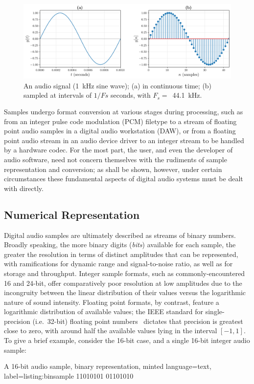 \begin{figure}[ht]
    \centering
    \includegraphics[width=\textwidth]{figures/digital-signal}
    \caption{
        An audio signal (\qty{1}{\kHz} sine wave);
        (a) in continuous time;
        (b) sampled at intervals of $1/Fs$ seconds, with
        $F_s =$~\qty{44.1}{\kHz}.
    }
    \label{fig:signal-samples}
\end{figure}

Samples undergo format conversion at various stages during processing, such as
from an integer pulse code modulation (PCM) filetype to a stream of floating
point audio samples in a digital audio workstation (DAW), or from a floating
point audio stream in an audio device driver to an integer stream to be handled
by a hardware codec.
For the most part, the user, and even the developer of audio software, need not
concern themselves with the rudiments of sample representation and conversion;
as shall be shown, however, under certain circumstances these fundamental
aspects of digital audio systems must be dealt with directly.

\subsection{Numerical Representation}\label{subsec:numerical-representation}

Digital audio samples are ultimately described as streams of binary numbers.
Broadly speaking, the more binary digits (\textit{bits}) available for each
sample, the greater the resolution in terms of distinct amplitudes that can be
represented, with ramifications for dynamic range and signal-to-noise ratio, as
well as for storage and throughput.
Integer sample formats, such as commonly-encountered 16 and 24-bit, offer
comparatively poor resolution at low amplitudes due to the incongruity between
the linear distribution of their values versus the logarithmic nature of sound
intensity.
Floating point formats, by contrast, feature a logarithmic distribution of
available values; the IEEE standard for single-precision (i.e.\ 32-bit) floating
point numbers~\citep{ieee_ieee_1985} dictates that precision is greatest close
to zero, with around half the available values lying in the interval $[-1, 1]$.
To give a brief example, consider the 16-bit case, and a single 16-bit integer
audio sample:
\begin{codelisting}{
        {A 16-bit audio sample, binary representation},
    minted language=text,
    label=listing:binsample
}
    11010101 01101010
\end{codelisting}

